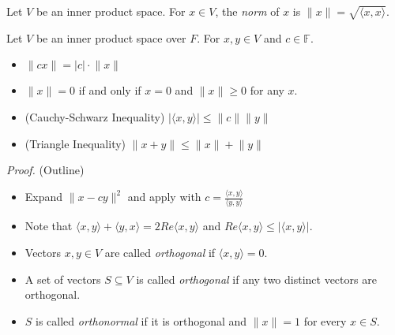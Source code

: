 \documentclass[12pt]{article}
\newenvironment{theorem}[2][Theorem]{\begin{trivlist}
\item[\hskip \labelsep {\bfseries #1}\hskip \labelsep {\bfseries #2.}]}{\end{trivlist}}
\newenvironment{definition}[2][Definition]{\begin{trivlist}
\item[\hskip \labelsep {\bfseries #1}\hskip \labelsep {\bfseries #2}]}{\end{trivlist}}
\begin{document}
\begin{definition}{3}
Let $V$ be an inner product space. For $x \in V$, the \textit{norm} of $x$ is $\lVert x \rVert = \sqrt{\langle x, x \rangle}$.
\end{definition}

\begin{theorem}{6.2}
Let $V$ be an inner product space over $F$. For $x,y \in V$ and $c \in \mathbb{F}$.

\begin{itemize}
    \item[(a)] $\lVert cx \rVert = |c| \cdot \lVert x \rVert$
    
    \item[(b)] $\lVert x \rVert = 0$ if and only if $x = 0$ and $\lVert x \rVert \geq 0$ for any $x$.
    
    \item[(c)] (Cauchy-Schwarz Inequality) $\lvert \langle x, y \rangle \rvert \leq \lVert c \rVert \lVert y \rVert$
    
    \item[(d)] (Triangle Inequality) $\lVert x + y \rVert \leq \lVert x \rVert + \lVert y \rVert$
\end{itemize}
\end{theorem}

\textit{Proof.} (Outline)

\begin{itemize}
    \item[(c)] Expand $\lVert x - cy\rVert^2$ and apply with $c = \frac{\langle x, y \rangle}{\langle y, y \rangle}$
    
    \item[(d)] Note that $\langle x, y \rangle + \langle y, x \rangle = 2Re\langle x, y \rangle$ and $Re\langle x, y \rangle \leq \lvert \langle x, y \rangle \rvert$.
\end{itemize}

\begin{definition}{4} \textit{ }
\begin{itemize}
    \item Vectors $x,y \in V$ are called \textit{orthogonal} if $\langle x, y \rangle = 0$.
    
    \item A set of vectors $S \subseteq V$ is called \textit{orthogonal} if any two distinct vectors are orthogonal.
    
    \item $S$ is called \textit{orthonormal} if it is orthogonal and $\lVert x \rVert = 1$ for every $x \in S$.
\end{itemize}
\end{definition}
\end{document}

